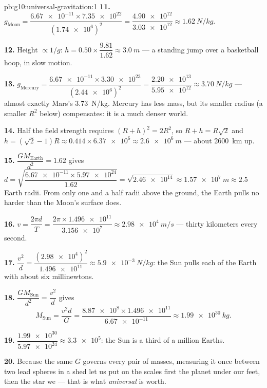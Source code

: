 \begin{solution}{pb:g10:universal-gravitation:1}
\textbf{11.} $g_{\text{Moon}} = \dfrac{\num{6.67e-11} \times
\num{7.35e22}}{(\num{1.74e6})^2} = \dfrac{\num{4.90e12}}
{\num{3.03e12}} \approx \qty{1.62}{N/kg}$.

\textbf{12.} Height $\propto 1/g$:
$h = 0.50 \times \dfrac{9.81}{1.62} \approx \qty{3.0}{m}$ --- a
standing jump over a basketball hoop, in slow motion.

\textbf{13.} $g_{\text{Mercury}} = \dfrac{\num{6.67e-11} \times
\num{3.30e23}}{(\num{2.44e6})^2} = \dfrac{\num{2.20e13}}
{\num{5.95e12}} \approx \qty{3.70}{N/kg}$ --- almost exactly Mars's
\qty{3.73}{N/kg}. Mercury has less mass, but its smaller radius (a
smaller $R^2$ below) compensates: it is a much denser world.

\textbf{14.} Half the field strength requires
$(R + h)^2 = 2 R^2$, so $R + h = R\sqrt{2}$ and
$h = (\sqrt{2} - 1) R \approx 0.414 \times \num{6.37e6}
\approx \qty{2.6e6}{m}$ --- about \qty{2600}{km} up.

\textbf{15.} $\dfrac{G M_{\text{Earth}}}{d^2} = 1.62$ gives
$d = \sqrt{\dfrac{\num{6.67e-11} \times \num{5.97e24}}{1.62}}
= \sqrt{\num{2.46e14}} \approx \qty{1.57e7}{m} \approx 2.5$ Earth
radii. From only one and a half radii above the ground, the Earth
pulls no harder than the Moon's surface does.

\textbf{16.} $v = \dfrac{2\pi d}{T}
= \dfrac{2\pi \times \num{1.496e11}}{\num{3.156e7}}
\approx \qty{2.98e4}{m/s}$ --- thirty kilometers every second.

\textbf{17.} $\dfrac{v^2}{d} = \dfrac{(\num{2.98e4})^2}{\num{1.496e11}}
\approx \qty{5.9e-3}{N/kg}$: the Sun pulls each  of the Earth
with about six millinewtons.

\textbf{18.} $\dfrac{G M_{\text{Sun}}}{d^2} = \dfrac{v^2}{d}$ gives
\[
M_{\text{Sun}} = \frac{v^2 d}{G}
= \frac{\num{8.87e8} \times \num{1.496e11}}{\num{6.67e-11}}
\approx \qty{1.99e30}{kg}.
\]

\textbf{19.} $\dfrac{\num{1.99e30}}{\num{5.97e24}} \approx
\num{3.3e5}$: the Sun is a third of a million Earths.

\textbf{20.} Because the same $G$ governs every pair of masses,
measuring it once between two lead spheres in a shed let us put on the
scales first the planet under our feet, then the star we  ---
that is what \emph{universal} is worth.
\end{solution}
